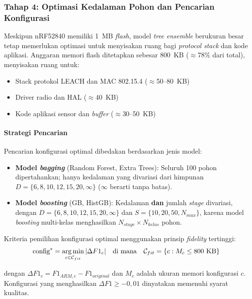 \subsubsection{Tahap 4: Optimasi Kedalaman Pohon dan Pencarian Konfigurasi}

Meskipun nRF52840 memiliki 1~MB \textit{flash}, model \textit{tree ensemble} berukuran besar tetap memerlukan optimasi untuk menyisakan ruang bagi \textit{protocol stack} dan kode aplikasi. Anggaran memori flash ditetapkan sebesar 800~KB ($\approx$78\% dari total), menyisakan ruang untuk:

\begin{itemize}
    \item Stack protokol LEACH dan MAC 802.15.4 ($\approx$50--80~KB)
    \item Driver radio dan HAL ($\approx$40~KB)
    \item Kode aplikasi sensor dan \textit{buffer} ($\approx$30--50~KB)
\end{itemize}

\paragraph{Strategi Pencarian}
Pencarian konfigurasi optimal dibedakan berdasarkan jenis model:

\begin{itemize}
    \item \textbf{Model \textit{bagging}} (Random Forest, Extra Trees): Seluruh 100 pohon dipertahankan; hanya kedalaman yang divariasi dari himpunan $D = \{6, 8, 10, 12, 15, 20, \infty\}$ ($\infty$ berarti tanpa batas).
    \item \textbf{Model \textit{boosting}} (GB, HistGB): Kedalaman \textbf{dan} jumlah \textit{stage} divariasi, dengan $D = \{6, 8, 10, 12, 15, 20, \infty\}$ dan $S = \{10, 20, 50, N_{max}\}$, karena model \textit{boosting} multi-kelas menghasilkan $N_{stage} \times N_{kelas}$ pohon.
\end{itemize}

Kriteria pemilihan konfigurasi optimal menggunakan prinsip \textit{fidelity} tertinggi:
\begin{equation}
    \text{config}^{*} = \operatorname*{arg\,min}_{c \in \mathcal{C}_{fit}} |\Delta F1_c|
    \quad \text{di mana} \quad
    \mathcal{C}_{fit} = \{c : M_c \leq 800 \text{ KB}\}
\end{equation}

dengan $\Delta F1_c = F1_{ARM,c} - F1_{original}$ dan $M_c$ adalah ukuran memori konfigurasi $c$. Konfigurasi yang menghasilkan $\Delta F1 \geq -0{,}01$ dinyatakan memenuhi syarat kualitas.

